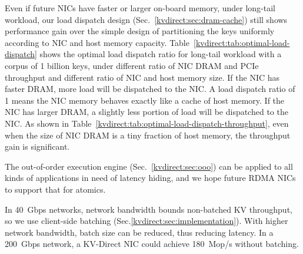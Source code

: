 \begin{table}[t]
\centering
{}
\caption{Relative throughput of load dispatch compared to simple partitioning. Column titles are same as Table~\ref{kvdirect:tab:optimal-load-dispatch}.}
\label{kvdirect:tab:optimal-load-dispatch-throughput}

\end{table}


Even if future NICs have faster or larger on-board memory, under long-tail workload, our load dispatch design (Sec.~\ref{kvdirect:sec:dram-cache}) still shows performance gain over the simple design of partitioning the keys uniformly according to NIC and host memory capacity.
Table~\ref{kvdirect:tab:optimal-load-dispatch} shows the optimal load dispatch ratio for long-tail workload with a corpus of 1 billion keys, under different ratio of NIC DRAM and PCIe throughput and different ratio of NIC and host memory size.
If the NIC has faster DRAM, more load will be dispatched to the NIC. A load dispatch ratio of 1 means the NIC memory behaves exactly like a cache of host memory.
If the NIC has larger DRAM, a slightly less portion of load will be dispatched to the NIC.
As shown in Table~\ref{kvdirect:tab:optimal-load-dispatch-throughput}, even when the size of NIC DRAM is a tiny fraction of host memory, the throughput gain is significant.

The out-of-order execution engine (Sec.~\ref{kvdirect:sec:ooo}) can be applied to all kinds of applications in need of latency hiding, and we hope future RDMA NICs to support that for atomics.

In 40~Gbps networks, network bandwidth bounds non-batched KV throughput, so we use client-side batching (Sec.\ref{kvdirect:sec:implementation}). With higher network bandwidth, batch size can be reduced, thus reducing latency. In a 200~Gbps network, a KV-Direct NIC could achieve 180~Mop/s without batching.

